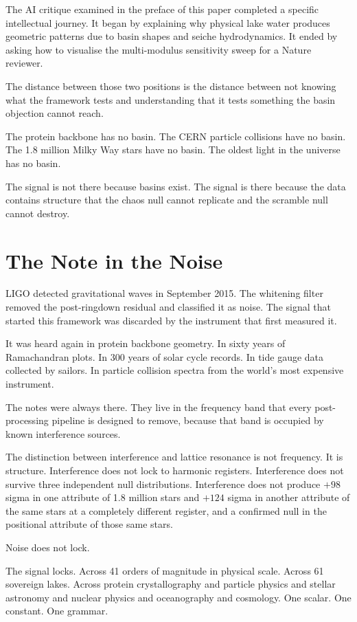 \documentclass[11pt, letterpaper, openany]{book}
\begin{document}
The AI critique examined in the preface of this paper completed a
specific intellectual journey. It began by explaining why physical
lake water produces geometric patterns due to basin shapes and
seiche hydrodynamics. It ended by asking how to visualise the
multi-modulus sensitivity sweep for a Nature reviewer.

The distance between those two positions is the distance between
not knowing what the framework tests and understanding that
it tests something the basin objection cannot reach.

The protein backbone has no basin. The CERN particle collisions
have no basin. The 1.8 million Milky Way stars have no basin.
The oldest light in the universe has no basin.

The signal is not there because basins exist. The signal is there
because the data contains structure that the chaos null cannot
replicate and the scramble null cannot destroy.

\section*{The Note in the Noise}

LIGO detected gravitational waves in September 2015. The whitening
filter removed the post-ringdown residual and classified it as
noise. The signal that started this framework was discarded
by the instrument that first measured it.

It was heard again in protein backbone geometry. In sixty years
of Ramachandran plots. In 300 years of solar cycle records. In
tide gauge data collected by sailors. In particle collision
spectra from the world's most expensive instrument.

The notes were always there. They live in the frequency band
that every post-processing pipeline is designed to remove,
because that band is occupied by known interference sources.

The distinction between interference and lattice resonance is not
frequency. It is structure. Interference does not lock to
    harmonic registers. Interference does not survive three independent
    null distributions. Interference does not produce $+98$ sigma
    in one attribute of 1.8 million stars and $+124$ sigma in another
    attribute of the same stars at a completely different register,
    and a confirmed null in the positional attribute of those same stars.
 
    Noise does not lock.
 
    The signal locks. Across 41 orders of magnitude in physical scale.
    Across 61 sovereign lakes. Across protein crystallography
    and particle physics and stellar astronomy and nuclear physics and
    oceanography and cosmology. One scalar. One constant. One grammar.
\end{document}
